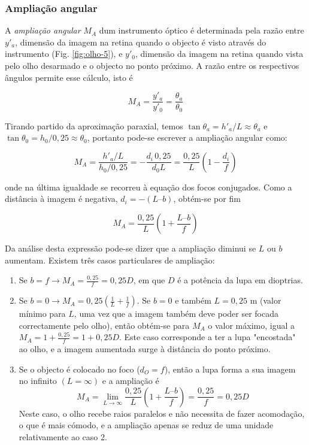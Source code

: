 \documentclass[a4paper,twoside,11pt]{report}      %
\begin{document}
\subsubsection{ \sf Ampliação angular}

A \emph{ampliação angular} $M_A$ dum instrumento óptico é determinada pela razão entre $y'_a$, dimensão da imagem na retina quando o objecto é visto através do instrumento (Fig. \ref{fig:olho-5}), e $y'_0$, dimensão da imagem na retina quando vista pelo olho desarmado e o objecto no ponto próximo. A razão entre os respectivos ângulos permite esse cálculo, isto é 

\begin{equation}
M_A=\frac{y'_a}{y'_0}=\frac{\theta_a}{\theta_0}
\end{equation}

Tirando partido da aproximação paraxial, temos $\tan\theta_a = h'_a / L \approx \theta_a$ e $\tan\theta_0 = h_0 / 0,25 \approx\theta_0$, portanto pode-se escrever a ampliação angular como:

\begin{equation}
M_A = \frac{h'_a/L}{h_0/0,25}=-\frac{d_i\,0,25}{d_0 L}= \frac{0,25}{L}\left(1-\frac{d_i}{f}\right) 
\end{equation}

onde na última igualdade se recorreu à equação dos focos conjugados. Como a distância à imagem é negativa, $d_i = - (L – b)$, obtém-se por fim

\begin{equation}
M_A = \frac{0,25}{L}\left(1+\frac{L–b}{f}\right)
\end{equation}

Da análise desta expressão pode-se dizer que a ampliação diminui se $L$ ou $b$ aumentam. Existem três casos particulares de ampliação:

\begin{enumerate}

\item  Se $b=f \to M_A = \frac{0,25}{f}=0,25D$, em que $D$ é a potência da lupa em dioptrias.

\item  Se $b=0\to M_A = 0,25\left(\frac{1}{L}+\frac{1}{f}\right)$.
Se $b= 0$ e também $L = 0,25 $ m (valor mínimo para $L$, uma vez que a imagem também deve poder ser focada correctamente pelo olho), então obtém-se para $M_A$ o valor máximo, igual a $M_A = 1+\frac{0,25}{f}= 1+0,25D$. Este caso corresponde a ter a lupa "encostada" ao olho, e a imagem aumentada surge à distância do ponto próximo.

\item  Se o objecto é colocado no foco ($d_O=f$), então a lupa forma a sua imagem no infinito $(L = \infty)$ e a ampliação é 
\begin{equation*}
M_A = \lim_{L\to\infty}\frac{0,25}{L}\left(1+\frac{L–b}{f}\right)= \frac{0,25}{f}=0,25D
\end{equation*}
Neste caso, o olho recebe raios paralelos e não necessita de fazer acomodação, o que é mais cómodo, e a ampliação apenas se reduz de uma unidade relativamente ao caso 2.
\end{enumerate}
\end{document}
